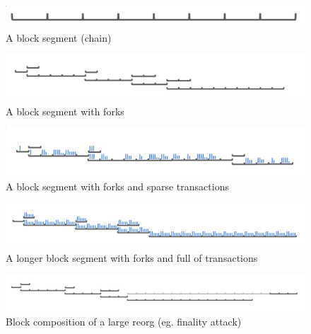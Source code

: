 \documentclass[11pt]{article}
\theoremstyle{plain}
\begin{document}
\begin{figure}[tph]
\centering
\includegraphics[width=1.0\textwidth]{vis_blocksegment.png}
\caption{A block segment (chain)}
\label{fig:blocksegment}
\end{figure}

\begin{figure}[tph]
\centering
\includegraphics[width=1.0\textwidth]{vis_blocksegment_forking.png}
\caption{A block segment with forks}
\label{fig:blocksegment_forks}
\end{figure}

\begin{figure}[tph]
\centering
\includegraphics[width=1.0\textwidth]{vis_blocksegment_forking_txs_sparse.png}
\caption{A block segment with forks and sparse transactions}
\label{fig:blocksegment_forks_txs_sparse}
\end{figure}

\begin{figure}[tph]
\centering
\includegraphics[width=1.0\textwidth]{vis_blocksegment_forking_txs_full.png}
\caption{A longer block segment with forks and full of transactions}
\label{fig:blocksegment_forks_txs_full}
\end{figure}


\begin{figure}[tph]
\centering
\includegraphics[width=1.0\textwidth]{vis_blocksegment_forking_reorg.png}
\caption{Block composition of a large reorg (eg. finality attack)}
\label{fig:blocksegment_forks_reorg}
\end{figure}
\end{document}
